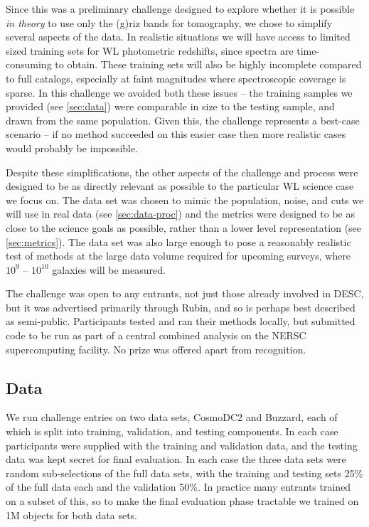 \documentclass[twocolumn,twocolappendix]{aastex63}
\begin{document}
Since this was a preliminary challenge designed to explore whether it is possible \emph{in theory}
to use only the (g)riz bands for tomography, we chose to simplify several aspects of the data.  In realistic 
situations we will have access to limited sized training sets for WL photometric redshifts, since 
spectra are time-consuming to obtain.  These training sets will also be highly incomplete compared
to full catalogs, especially at faint magnitudes where spectroscopic coverage is sparse.  In this
challenge we avoided both these issues -- the training samples we provided (see \autoref{sec:data}) were comparable
in size to the testing sample, and drawn from the same population.  Given this, the challenge
represents a best-case scenario -- if no method succeeded on this easier case then more realistic
cases would probably be impossible.

Despite these simplifications, the other aspects of the challenge and process were designed to be
as directly relevant as possible to the particular WL science case we focus on.  The data set
was chosen to mimic the population, noise, and cuts we will use in real data (see \autoref{sec:data-proc}) 
and the metrics were designed to be as close to the science goals as possible, rather than a lower
level representation (see \autoref{sec:metrics}). The data set was also large enough to pose a 
reasonably realistic test of methods at the large data volume required for upcoming surveys, where
$10^9$ -- $10^{10}$ galaxies will be measured.

The challenge was open to any entrants, not just those already involved in DESC, but it was
advertised primarily through Rubin, and so is perhaps best described as semi-public.
Participants tested and ran their methods locally, but submitted code to be run as part of a central
combined analysis on the NERSC supercomputing facility.  No prize was offered apart from recognition.


\subsection{Data}
\label{sec:data}

We run challenge entries on two data sets, CosmoDC2 and Buzzard, each of which is split into training, 
validation, and testing components.  In each case participants were supplied with the training and 
validation data, and the testing data was kept secret for final evaluation. In each case the three
data sets were random sub-selections of the full data sets, with the training and testing sets 25\% of 
the full data each and the validation 50\%. In practice many entrants trained on a subset of
this, so to make the final evaluation phase tractable we trained on 1M objects for both data sets.
\end{document}
